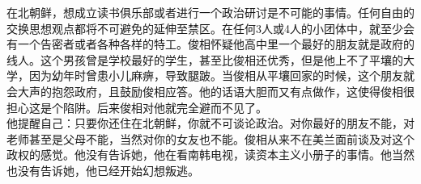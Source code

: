 在北朝鲜，想成立读书俱乐部或者进行一个政治研讨是不可能的事情。任何自由的交换思想观点都将不可避免的延伸至禁区。在任何3人或4人的小团体中，就至少会有一个告密者或者各种各样的特工。俊相怀疑他高中里一个最好的朋友就是政府的线人。这个男孩曾是学校最好的学生，甚至比俊相还优秀，但是他上不了平壤的大学，因为幼年时曾患小儿麻痹，导致腿跛。当俊相从平壤回家的时候，这个朋友就会大声的抱怨政府，且鼓励俊相应答。他的话语大胆而又有点做作，这使得俊相很担心这是个陷阱。后来俊相对他就完全避而不见了。\\

他提醒自己：只要你还住在北朝鲜，你就不可谈论政治。对你最好的朋友不能，对老师甚至是父母不能，当然对你的女友也不能。俊相从来不在美兰面前谈及对这个政权的感觉。他没有告诉她，他在看南韩电视，读资本主义小册子的事情。他当然也没有告诉她，他已经开始幻想叛逃。\\
